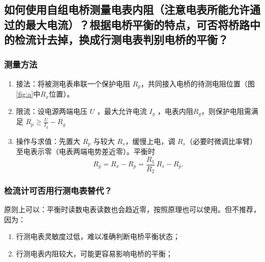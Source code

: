 \documentclass[]{../../templates/Report}%
\begin{document}
\begin{fullreportonly}
\subsection{如何使用自组电桥测量电表内阻（注意电表所能允许通过的最大电流）？根据电桥平衡的特点，可否将桥路中的检流计去掉，换成行测电表判别电桥的平衡？}

\subsubsection{测量方法}
    \begin{enumerate}
      \item 接法：将被测电表串联一个保护电阻 $R_p$，共同接入电桥的待测电阻位置（图\ref{fig:a}中$R_x$位置）。
      \item 限流：设电源两端电压 $U$ ，最大允许电流 $I_g$ ，电表内阻$R_g$，则保护电阻需满足
      $ R_p \ge \frac{U}{I_g} - R_g$
      \item 操作与求值：先置大 $R_p$ 与较大 $R_s$，缓慢上电，调 $R_s$（必要时微调比率臂）至电表示零（电表两端电势差近零）。平衡时
      \[
        R_g = R_x- R_p = \frac{R_1}{R_2}\,R_s- R_p.
      \]
    \end{enumerate}

\subsubsection{检流计可否用行测电表替代？}
    原则上可以：平衡时读数电表读数也会趋近零，按照原理也可以使用。但不推荐，因为：
    \begin{enumerate}
      \item 行测电表灵敏度过低，难以准确判断电桥平衡状态；
      \item 行测电表内阻较大，可能更容易影响电桥的平衡；
    \end{enumerate}

\end{fullreportonly}
\insertnotes
\end{document}
